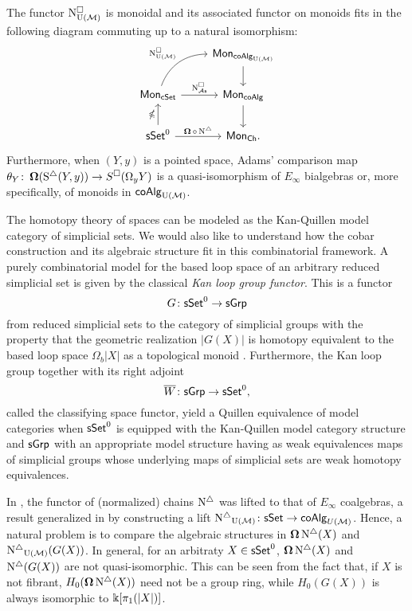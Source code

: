 \begin{theorem} \label{t:1st main thm in the intro}
	The functor $\operatorname{N^{\square}_{{\operatorname{U}(\mathcal{M})}}}$ is monoidal and its associated functor on monoids fits in the following diagram commuting up to a natural isomorphism:
	\begin{equation*}
	\begin{tikzcd}
	& \Mon_{\coAlg_\UM} \arrow[d] \\
	\Mon_{\cSet} \arrow[ru, "\cchainsUM", out=70, in=180] \arrow[r, "\cchainsAS"]
	& \Mon_{\coAlg} \arrow[d] \\
	\sSet^0 \arrow[r, "\cobar \circ \schains"] \arrow[u, "\ccobar"]
	& \Mon_{\Ch}.
	\end{tikzcd}
	\end{equation*}
	Furthermore, when $(Y, y)$ is a pointed space, Adams' comparison map $\theta_Y \colon \operatorname{\mathbf{\Omega}}(\operatorname{S^{\triangle}}(Y, y)) \to S^{\square}(\Omega_y Y)$ is a quasi-isomorphism of $E_\infty$ bialgebras or, more specifically, of monoids in $\mathsf{coAlg}_{\operatorname{U}(\mathcal{M})}$.
\end{theorem} 
The homotopy theory of spaces can be modeled as the Kan-Quillen model category of simplicial sets. We would also like to understand how the cobar construction and its algebraic structure fit in this combinatorial framework. A purely combinatorial model for the based loop space of an arbitrary reduced simplicial set is given by the classical \textit{Kan loop group functor}.
This is a functor 
$$G\colon \mathsf{sSet}^0 \to \mathsf{sGrp}$$
from reduced simplicial sets to the category of simplicial groups with the property that the geometric realization $|G(X)|$ is homotopy equivalent to the based loop space $\Omega_b|X|$ as a topological monoid \cite{berger1995loops}. Furthermore, the Kan loop group together with its right adjoint $$\overline{W} \colon  \mathsf{sGrp} \to \mathsf{sSet}^0,$$ called the classifying space functor, yield a Quillen equivalence of model categories when $\mathsf{sSet}^0$ is equipped with the Kan-Quillen model category structure and $\mathsf{sGrp}$ with an appropriate model structure having as weak equivalences maps of simplicial groups whose underlying maps of simplicial sets are weak homotopy equivalences. 

In \cite{mcclure2003multivariable, berger2004combinatorial}, the functor of (normalized) chains $\operatorname{N^{\triangle}}$ was lifted to that of $E_\infty$ coalgebras, a result generalized in \cite{medina2020prop1} by constructing a lift $\operatorname{N^{\triangle}}_{{\operatorname{U}(\mathcal{M})}} \colon \mathsf{sSet} \to \mathsf{coAlg}_{U(\mathcal{M})}$. Hence, a natural problem is to compare the algebraic structures in $\operatorname{\mathbf{\Omega}} \operatorname{N^{\triangle}}(X)$ and $\operatorname{N^{\triangle}}_{{\operatorname{U}(\mathcal{M})}}(G(X))$. In general, for an arbitraty $X \in \mathsf{sSet}^0$, $\operatorname{\mathbf{\Omega}} \operatorname{N^{\triangle}}(X)$ and $\operatorname{N^{\triangle}}(G(X))$ are not quasi-isomorphic.
This can be seen from the fact that, if $X$ is not fibrant, $H_0(\operatorname{\mathbf{\Omega}} \operatorname{N^{\triangle}}(X))$ need not be a group ring, while $H_0(G(X))$ is always isomorphic to $ \Bbbk[\pi_1(|X|)]$.

